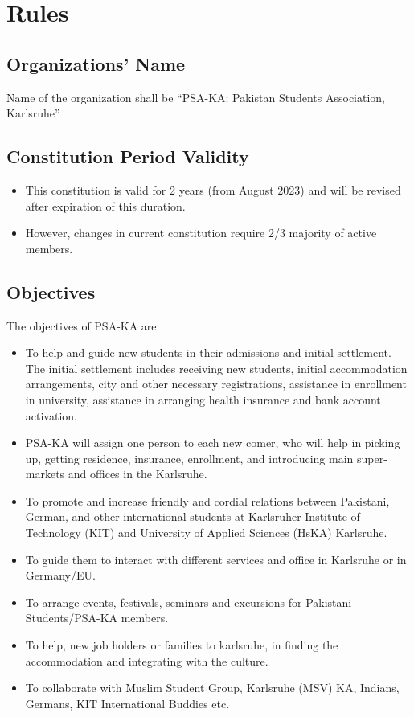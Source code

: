 \chapter{Rules}
\section{Organizations’ Name}
Name of the organization shall be “PSA-KA: Pakistan Students Association, Karlsruhe” 
\section{Constitution Period Validity }
\begin{itemize}
	\item This constitution is valid for 2 years (from August 2023) and will be revised after expiration of this duration. 
	\item However, changes in current constitution require 2/3 majority of active members. 
\end{itemize}
\section{Objectives }
The objectives of PSA-KA are: 
\begin{itemize}
	\item To help and guide new students in their admissions and initial settlement. The initial settlement includes receiving new students, initial accommodation arrangements, city and other necessary registrations, assistance in enrollment in university, assistance in arranging health insurance and bank account activation. 
	\item PSA-KA will assign one person to each new comer, who will help in picking up, getting residence, insurance, enrollment, and introducing main super-markets and offices in the Karlsruhe.
	\item To promote and increase friendly and cordial relations between Pakistani, German, and other international students at Karlsruher Institute of Technology (KIT) and University of Applied Sciences (HsKA) Karlsruhe. 
	\item To guide them to interact with different services and office in Karlsruhe or in Germany/EU. 
	\item To arrange events, festivals, seminars and excursions for Pakistani Students/PSA-KA members. 
	\item To help, new job holders or families to karlsruhe, in finding the accommodation and integrating with the culture.
	\item To collaborate with Muslim Student Group, Karlsruhe (MSV) KA, Indians, Germans, KIT International Buddies etc. 
\end{itemize}

